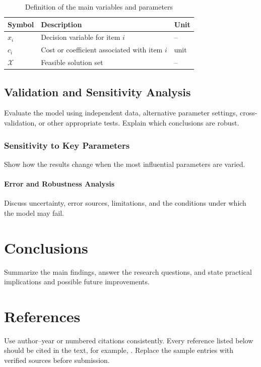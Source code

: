 \documentclass[11pt,a4paper]{article}
\begin{document}
\begin{table}[H]
  \centering
  \caption{Definition of the main variables and parameters}
  \label{tab:notation}
  \begin{tabularx}{0.9\textwidth}{@{}lXl@{}}
    \toprule
    Symbol & Description & Unit \\
    \midrule
    $x_i$ & Decision variable for item $i$ & -- \\
    $c_i$ & Cost or coefficient associated with item $i$ & unit \\
    $\mathcal{X}$ & Feasible solution set & -- \\
    \bottomrule
  \end{tabularx}
\end{table}

\subsection{Validation and Sensitivity Analysis}
Evaluate the model using independent data, alternative parameter settings, cross-validation,
or other appropriate tests. Explain which conclusions are robust.

\subsubsection{Sensitivity to Key Parameters}
Show how the results change when the most influential parameters are varied.

\paragraph{Error and Robustness Analysis}
Discuss uncertainty, error sources, limitations, and the conditions under which the model may fail.

\section{Conclusions}
Summarize the main findings, answer the research questions, and state practical implications
and possible future improvements.

\clearpage
{}
\section*{References}
Use author--year or numbered citations consistently. Every reference listed below should
be cited in the text, for example, \cite{example-paper}. Replace the sample entries with
verified sources before submission.
\end{document}
